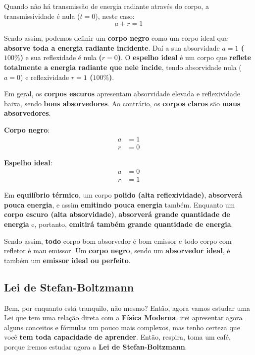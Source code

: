 \documentclass[12pt,twoside]{article}
\begin{document}
Quando não há transmissão de energia radiante através do corpo, a transmissividade é nula (\textbf{$t=0$}), neste caso: \[\boxed{a+r=1}\]


Sendo assim, podemos definir um \textbf{corpo negro} como um corpo ideal que \textbf{absorve toda a energia radiante incidente}. Daí a sua absorvidade \textbf{$a=1$ ($100\%$)} e sua reflexidade é nula \textbf{($r=0$)}. O \textbf{espelho ideal} é um corpo que \textbf{reflete totalmente a energia radiante que nele incide}, tendo absorvidade nula (\textbf{$a=0$}) e reflexividade \textbf{$r=1$ ($100\%$)}.


Em geral, os \textbf{corpos escuros} apresentam absorvidade elevada e reflexividade baixa, sendo \textbf{bons absorvedores}. Ao contrário, os \textbf{corpos claros} são \textbf{maus absorvedores}.


\textbf{Corpo negro}:
\begin{align*}
a &= 1\\
r &= 0
\end{align*}


\textbf{Espelho ideal}:
\begin{align*}
a &= 0\\
r &= 1
\end{align*}


Em \textbf{equilíbrio térmico}, um corpo \textbf{polido (alta reflexividade)}, \textbf{absorverá pouca energia}, e assim \textbf{emitindo pouca energia} também. Enquanto um \textbf{corpo escuro (alta absorvidade)}, \textbf{absorverá grande quantidade de energia} e, portanto, \textbf{emitirá também grande quantidade de energia}.


Sendo assim, \textbf{todo} corpo bom absorvedor é bom emissor e todo corpo com refletor é mau emissor. Um \textbf{corpo negro}, sendo um \textbf{absorvedor ideal}, é também um \textbf{emissor ideal ou perfeito}.


\hypertarget{x-lei-de-stefan-boltzmann}{\subsection{Lei de Stefan-Boltzmann}}
Bem, por enquanto está tranquilo, não mesmo? Então, agora vamos estudar uma Lei que tem uma relação direta com a \textbf{Física Moderna}, irei apresentar agora alguns conceitos e fórmulas um pouco mais complexos, mas tenho certeza que você \textbf{tem toda capacidade de aprender}. Então, respira, toma um café, porque iremos estudar agora a \textbf{Lei de Stefan-Boltzmann}.
\end{document}
